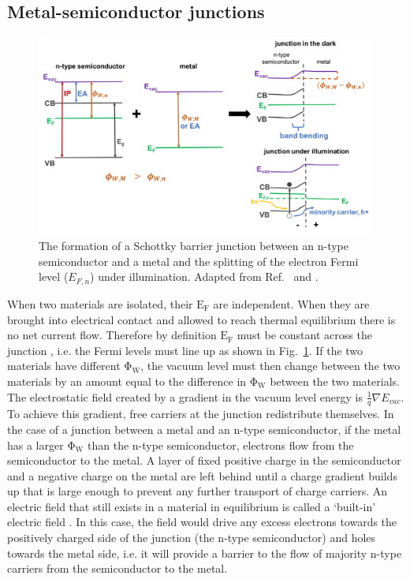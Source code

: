 \documentclass[11pt, twoside]{report}
\begin{document}
\subsection{Metal-semiconductor junctions}
\begin{figure}[h!]
  \centering
    \includegraphics[width=1.0\textwidth]{figures/schottky_schematic.png}
    \caption[The formation of a Schottky barrier junction between an n-type semiconductor and a metal and the splitting of the electron Fermi level ($E_{F,n}$) under illumination]{The formation of a Schottky barrier junction between an n-type semiconductor and a metal and the splitting of the electron Fermi level ($E_{F,n}$) under illumination. Adapted from Ref.~ and .}
  \label{schottky_schematic}
\end{figure}

When two materials are isolated, their $\mathrm{E_F}$ are independent. When they are brought into electrical contact and allowed to reach thermal equilibrium there is no net current flow. Therefore by definition $\mathrm{E_F}$ must be constant across the junction \cite{PV_bands_book}, i.e. the Fermi levels must line up as shown in Fig.~\ref{schottky_schematic}. 
If the two materials have different $\mathrm{\Phi_W}$, the vacuum level must then change between the two materials by an amount equal to the difference in $\mathrm{\Phi_W}$ between the two materials. The electrostatic field created by a gradient in the vacuum level energy is $\frac{1}{q} \nabla E_{vac}$.
To achieve this gradient, free carriers at the junction redistribute themselves. In the case of a junction between a metal and an n-type semiconductor, if the metal has a larger $\mathrm{\Phi_W}$ than the n-type semiconductor, electrons flow from the semiconductor to the metal. A layer of fixed positive charge in the semiconductor and a negative charge on the metal are left behind until a charge gradient builds up that is large enough to prevent any further transport of charge carriers. An electric field that still exists in a material in equilibrium is called a `built-in' electric field \cite{Nelson5}. In this case, the field would drive any excess electrons towards the positively charged side of the junction (the n-type semiconductor) and holes towards the metal side, i.e. it will provide a barrier to the flow of majority n-type carriers from the semiconductor to the metal.
\end{document}
